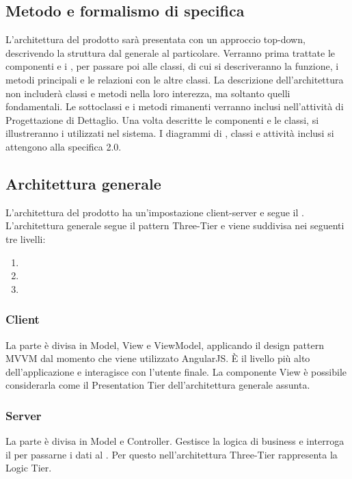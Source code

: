 \documentclass[a4paper, titlepage]{article}
\begin{document}
\subsection{Metodo e formalismo di specifica}
L'architettura del prodotto sarà presentata con un approccio top-down, descrivendo la struttura dal generale al particolare. Verranno prima trattate le componenti e i , per passare poi alle classi, di cui si descriveranno la funzione, i metodi principali e le relazioni con le altre classi. La descrizione dell'architettura non includerà classi e metodi nella loro interezza, ma soltanto quelli fondamentali. Le sottoclassi e i metodi rimanenti verranno inclusi nell'attività di Progettazione di Dettaglio.
	\newline
	Una volta descritte le componenti e le classi, si illustreranno i  utilizzati nel sistema. 
	\newline
	I diagrammi di , classi e attività inclusi si attengono alla specifica  2.0.
	
	\subsection{Architettura generale}
	L'architettura del prodotto ha un'impostazione client-server e segue il  . 
	\newline
	L'architettura generale segue il pattern Three-Tier e viene suddivisa nei seguenti tre livelli:
	\begin{enumerate}
		\item {} 
		\item {} 
		\item {}
	\end{enumerate}
	
	\subsubsection{Client}
	La parte  è divisa in Model, View e ViewModel, applicando il design pattern MVVM dal momento che viene utilizzato AngularJS. È il livello più alto dell'applicazione e interagisce con l'utente finale. La componente View è possibile considerarla come il Presentation Tier dell'architettura generale assunta.
	
	\subsubsection{Server}
	La parte  è divisa in Model e Controller. Gestisce la logica di business e interroga il  per passarne i dati al . Per questo nell'architettura Three-Tier rappresenta la Logic Tier.
	
\end{document}
